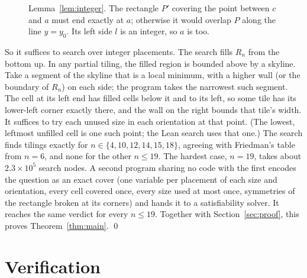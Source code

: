 \documentclass[11pt]{amsart}
\theoremstyle{definition}
\newcommand{\R}{R}
\begin{document}
\begin{figure}[ht]
\centering
{}
\caption{Lemma~\ref{lem:integer}. The rectangle $P'$ covering the point between $c$ and $a$ must end
exactly at $a$; otherwise it would overlap $P$ along the line $y=y_0$. Its left side $l$ is an
integer, so $a$ is too.}
\label{fig:integer}
\end{figure}

So it suffices to search over integer placements. The search fills $\R_n$ from the bottom up. In any
partial tiling, the filled region is bounded above by a skyline. Take a segment of the skyline that is a
local minimum, with a higher wall (or the boundary of $\R_n$) on each side; the program takes the narrowest
such segment. The cell at its left end has filled cells below it and to its left, so some tile has its
lower-left corner exactly there, and the wall on the right bounds that tile's width. It suffices to try
each unused size in each orientation at that point. (The lowest, leftmost unfilled cell is one such
point; the Lean search uses that one.) The search finds tilings exactly for $n\in\{4,10,12,14,15,18\}$, agreeing
with Friedman's table from $n=6$, and none for the other $n\le19$. The hardest case, $n=19$, takes about
$2.3\times10^5$ search nodes. A second program sharing no code with the first encodes the question as an
exact cover (one variable per placement of each size and orientation, every cell covered once, every size
used at most once, symmetries of the rectangle broken at its corners) and hands it to a satisfiability
solver. It reaches the same verdict for every $n\le19$. Together with Section~\ref{sec:proof}, this
proves Theorem~\ref{thm:main}. \qed

\section{Verification}\label{sec:verify}
\end{document}

